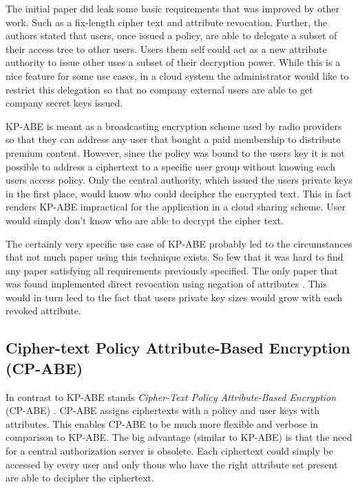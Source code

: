 The initial paper \cite{goyal2006attribute} did leak some basic requirements that was improved by other work. Such as a fix-length cipher text and attribute revocation. Further, the authors stated that users, once issued a policy, are able to delegate a subset of their access tree to other users. Users them self could act as a new attribute authority to issue other uses a subset of their decryption power. While this is a nice feature for some use cases, in a cloud system the administrator would like to restrict this delegation so that no company external users are able to get company secret keys issued. 

KP-ABE is meant as a broadcasting encryption scheme used by radio providers so that they can address any user that bought a paid membership to distribute premium content. However, since the policy was bound to the users key it is not possible to address a ciphertext to a specific user group without knowing each users access policy. Only the central authority, which issued the users private keys in the first place, would know who could decipher the encrypted text. This in fact renders \ac{KP-ABE} impractical for the application in a cloud sharing scheme. User would simply don't know who are able to decrypt the cipher text. 

The certainly very specific use case of \ac{KP-ABE} probably led to the circumstances that not much paper using this technique exists. So few that it was hard to find any paper satisfying all requirements previously specified. The only paper that was found implemented direct revocation using negation of attributes \cite{lewko2010revocation}. This would in turn leed to the fact that users private key sizes would grow with each revoked attribute. 

\subsection{Cipher-text Policy Attribute-Based Encryption (\ac{CP-ABE})}
In contrast to KP-ABE stands \textit{Cipher-Text Policy Attribute-Based Encryption} (\ac{CP-ABE}) \cite{bethencourt2007ciphertext}. \ac{CP-ABE} assigns ciphertexts with a policy and user keys with attributes. This enables \ac{CP-ABE} to be much more flexible and verbose in comparison to \ac{KP-ABE}. The big advantage (similar to \ac{KP-ABE}) is that the need for a central authorization server is obsolete. Each ciphertext could simply be accessed by every user and only thous who have the right attribute set present are able to decipher the ciphertext. 

